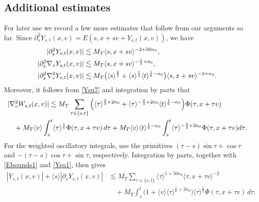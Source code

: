 \documentclass[reqno,11pt]{amsart}
\numberwithin{equation}{section}
\begin{document}
\subsection{Additional estimates} For later use we record a few more estimates that follow from our arguments so far. Since $\partial_s^2Y_{s,t}(x,v)=E(s,x+sv+Y_{s,t}(x,v))$, we have
		\begin{align}
			\label{x200}
			|\partial_s^2Y_{s,t}(x,v)|
			&\lesssim M_T\langle s,x+sv\rangle^{-2+50\kappa_0},\\
			|\partial_s^2\nabla_vY_{s,t}(x,v)|
			&\lesssim M_T\langle s,x+sv\rangle^{-\frac{5}{3}+\kappa_0},\notag\\
			\label{x202}
			|\partial_s^2\nabla_v^2Y_{s,t}(x,v)|
			&\lesssim M_T\big(\langle s\rangle^{\frac23}+\langle s\rangle^{\frac13}\langle t\rangle^{\frac16-\kappa_0}\big)\langle s,x+sv\rangle^{-2+\kappa_0}.
		\end{align}
Moreover, it follows from \eqref{Ysu7} and integration by parts that
		\begin{align}\label{x203}
			&|\nabla_v^2W_{s,t}(x,v)|\lesssim M_T\sum_{\tau\in\{s,t\}}\Big(\langle\tau\rangle^{\frac23+2\kappa_0}
			+\langle\tau\rangle^{-\frac23+2\kappa_0}\langle t\rangle^{\frac16-\kappa_0}\Big)\Phi(\tau,x+\tau v) \notag\\
			&\quad
			+M_T\langle v\rangle\int_s^t\langle\tau\rangle^{\frac16}\Phi(\tau,x+\tau v)\,d\tau
			+M_T\langle v\rangle\langle t\rangle^{\frac16-\kappa_0}\int_s^t\langle\tau\rangle^{-\frac23+2\kappa_0}\Phi(\tau,x+\tau v)d\tau .
		\end{align}
For the weighted oscillatory integrals, use the primitives
$(\tau-s)\sin\tau+\cos\tau$ and
$-(\tau-s)\cos\tau+\sin\tau$, respectively.
Integration by parts, together with \eqref{Ebounds1} and
\eqref{Ysu1}, then gives
\begin{align*}
|Y_{s,t}(x,v)|+\langle s\rangle|\partial_sY_{s,t}(x,v)|
&\lesssim M_T\sum_{\tau\in\{s,t\}}
\langle\tau\rangle^{1+50\kappa_0}
\langle\tau,x+\tau v\rangle^{-2}\\
&\quad+M_T\int_s^t
\bigl(1+\langle v\rangle
\langle\tau\rangle^{\frac16+2\kappa_0}\bigr)
\langle\tau\rangle^{\frac12}
\Phi(\tau,x+\tau v)\,d\tau.
\end{align*}

	
\end{document}

